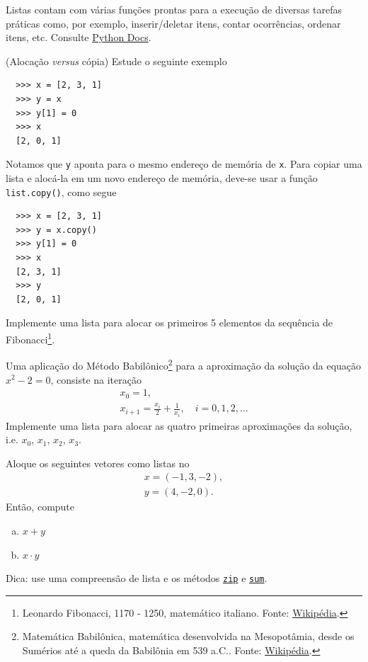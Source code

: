 \documentclass[12pt]{article}
\begin{document}
\begin{obs}
  Listas contam com várias funções prontas para a execução de diversas tarefas práticas como, por exemplo, inserir/deletar itens, contar ocorrências, ordenar itens, etc. Consulte \href{https://docs.python.org/3/tutorial/datastructures.html#more-on-lists}{Python Docs}.
\end{obs}

\begin{obs}(Alocação {\it versus} cópia)
  Estude o seguinte exemplo
  \begin{lstlisting}
  >>> x = [2, 3, 1]
  >>> y = x
  >>> y[1] = 0
  >>> x
  [2, 0, 1]
  \end{lstlisting}
  Notamos que \lstinline+y+ aponta para o mesmo endereço de memória de \lstinline+x+. Para copiar uma lista e alocá-la em um novo endereço de memória, deve-se usar a função \lstinline+list.copy()+, como segue
  \begin{lstlisting}
  >>> x = [2, 3, 1]
  >>> y = x.copy()
  >>> y[1] = 0
  >>> x
  [2, 3, 1]
  >>> y
  [2, 0, 1]
  \end{lstlisting}
\end{obs}

\begin{exr}
  Implemente uma lista para alocar os primeiros 5 elementos da sequência de Fibonacci\footnote{Leonardo Fibonacci, 1170 - 1250, matemático italiano. Fonte: \href{https://pt.wikipedia.org/wiki/Leonardo\_Fibonacci}{Wikipédia}.}.
\end{exr}

\begin{exr}
  Uma aplicação do Método Babilônico\footnote{Matemática Babilônica, matemática desenvolvida na Mesopotâmia, desde os Sumérios até a queda da Babilônia em 539 a.C.. Fonte: \href{https://pt.wikipedia.org/wiki/Matem\%C3\%A1tica\_babil\%C3\%B4nica}{Wikipédia}.} para a aproximação da solução da equação $x^2-2 = 0$, consiste na iteração
  \begin{gather}
    x_0 = 1,\\
    x_{i+1} = \frac{x_i}{2} + \frac{1}{x_i},\quad i=0,1,2,\ldots
  \end{gather}
  Implemente uma lista para alocar as quatro primeiras aproximações da solução, i.e. $x_0$, $x_1$, $x_2$, $x_3$.
\end{exr}

\begin{exr}
  Aloque os seguintes vetores como listas no {\python}
  \begin{gather}
    x = (-1, 3, -2),\\
    y = (4, -2, 0).
  \end{gather}
  Então, compute
  \begin{enumerate}[a)]
  \item $x+y$
  \item $x\cdot y$
  \end{enumerate}
  Dica: use uma compreensão de lista e os métodos {\python} \href{https://docs.python.org/3/library/functions.html#zip}{\lstinline+zip+} e \href{https://docs.python.org/3/library/functions.html?highlight=sum#sum}{\lstinline+sum+}.
\end{exr}
\end{document}
